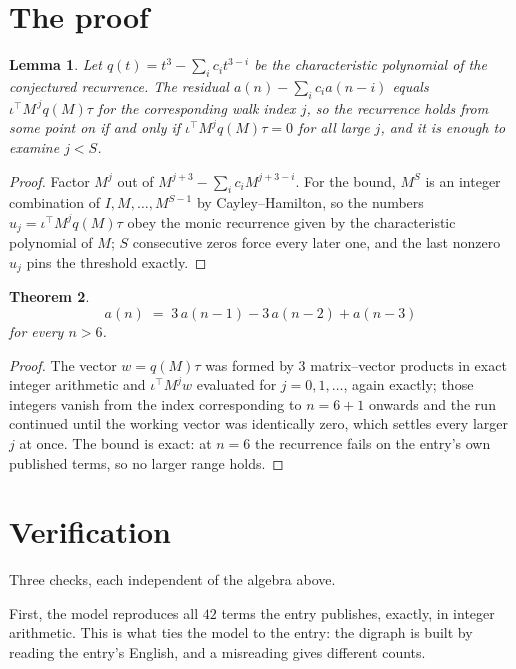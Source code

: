 \documentclass[11pt,a4paper]{article}
\theoremstyle{plain}
\newtheorem{theorem}{Theorem}
\newtheorem{lemma}[theorem]{Lemma}
\theoremstyle{definition}
\begin{document}
\section{The proof}

\begin{lemma}\label{lem:crit}
Let $q(t)=t^{3}-\sum_i c_it^{3-i}$ be the characteristic polynomial of the
conjectured recurrence. The residual $a(n)-\sum_ic_ia(n-i)$ equals
$\iota^{\!\top}M^{\,j}q(M)\tau$ for the corresponding walk index $j$, so the recurrence
holds from some point on if and only if $\iota^{\!\top}M^{j}q(M)\tau=0$ for all large $j$,
and it is enough to examine $j<S$.
\end{lemma}

\begin{proof}
Factor $M^{j}$ out of $M^{j+3}-\sum_ic_iM^{j+3-i}$. For the bound, $M^{S}$
is an integer combination of $I,M,\dots,M^{S-1}$ by Cayley--Hamilton, so the numbers
$u_j=\iota^{\!\top}M^{j}q(M)\tau$ obey the monic recurrence given by the characteristic
polynomial of $M$; $S$ consecutive zeros force every later one, and the last nonzero $u_j$
pins the threshold exactly.
\end{proof}

\begin{theorem}
\[
a(n)\;=\;3\,a(n-1) - 3\,a(n-2) + a(n-3)
\]
for every $n>6$.
\end{theorem}

\begin{proof}
The vector $w=q(M)\tau$ was formed by $3$ matrix--vector products in exact integer
arithmetic and $\iota^{\!\top}M^{j}w$ evaluated for $j=0,1,\dots$, again exactly; those
integers vanish from the index corresponding to $n=6+1$ onwards and the run continued
until the working vector was identically zero, which settles every larger $j$ at once. The bound is exact: at $n=6$ the recurrence fails on the entry's own published terms, so no larger range holds.
\end{proof}

\section{Verification}

Three checks, each independent of the algebra above.

First, the model reproduces all $42$ terms the entry publishes, exactly, in integer
arithmetic. This is what ties the model to the entry: the digraph is built by reading the
entry's English, and a misreading gives different counts.
\end{document}
